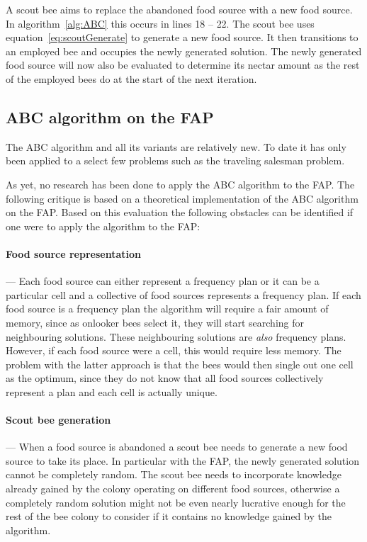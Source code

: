 A scout bee aims to replace the abandoned food source with a new food source. In algorithm~\ref{alg:ABC} this occurs in lines 18 -- 22. The scout bee uses equation~\ref{eq:scoutGenerate} to generate a new food source. It then transitions to an employed bee and occupies the newly generated solution. The newly generated food source will now also be evaluated to determine its nectar amount as the rest of the employed bees do at the start of the next iteration.


\subsection{ABC algorithm on the \gls{FAP}}
The \gls{ABC} algorithm and all its variants are relatively new. To date it has only been applied to a select few problems such as the traveling salesman problem.

As yet, no research has been done to apply the \gls{ABC} algorithm to the \gls{FAP}. The following critique is based on a theoretical implementation of the \gls{ABC} algorithm on the \gls{FAP}. Based on this evaluation the following obstacles can be identified if one were to apply the algorithm to the \gls{FAP}:
\paragraph{Food source representation}
--- Each food source can either represent a frequency plan or it can be a particular cell and a collective of food sources represents a frequency plan. If each food source is a frequency plan the algorithm will require a fair amount of memory, since as onlooker bees select it, they will start searching for neighbouring solutions. These neighbouring solutions are \emph{also} frequency plans. However, if each food source were a cell, this would require less memory. The problem with the latter approach is that the bees would then single out one cell as the optimum, since they do not know that all food sources collectively represent a plan and each cell is actually unique.
\paragraph{Scout bee generation}
--- When a food source is abandoned a scout bee needs to generate a new food source to take its place. In particular with the \gls{FAP}, the newly generated solution cannot be completely random. The scout bee needs to incorporate knowledge already gained by the colony operating on different food sources, otherwise a completely random solution might not be even nearly lucrative enough for the rest of the bee colony to consider if it contains no knowledge gained by the algorithm.
